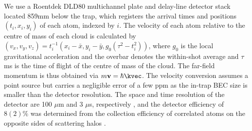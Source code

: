	We use a Roentdek DLD80 multichannel plate and delay-line detector stack \cite{Manning10} located 859mm below the trap, which registers the arrival times and positions $(t_i,x_i,y_i)$ of each atom, indexed by $i$. 
	The velocity of each atom relative to the centre of mass of each cloud is calculated by $(v_x,v_y,v_z) = t_{i}^{-1}(x_i-\bar{x},y_i-\bar{y},g_0(\tau^2-t_{i}^{2}))$, where $g_0$ is the local gravitational acceleration and the overbar denotes the within-shot average and $\tau$ ms is the time of flight of the centre of mass of the cloud. 
	The far-field momentum is thus obtained via $m\textbf{v} = \hbar\kvec$.
	The velocity conversion assumes a point source but carries a negligible error of a few ppm as the in-trap BEC size is smaller than the detector resolution. 
	The space and time resolution of the detector are 100 $\mu$m and 3 $\mu$s, respectively \cite{Henson18}, and the detector efficiency of $8(2)\%$ was determined from the collection efficiency of correlated atoms on the opposite sides of scattering halos \cite{shin19,shin20,Jaskula10}. 


